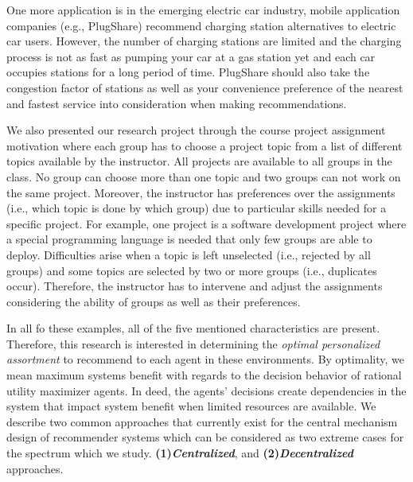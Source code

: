 \documentclass[11pt, letterpaper]{article}
\begin{document}
One more application is in the emerging electric car industry, mobile application companies (e.g., PlugShare) recommend charging station alternatives to electric car users. However, the number of charging stations are limited and the charging process is not as fast as pumping your car at a gas station yet and each car occupies stations for a long period of time. PlugShare should also take the congestion factor of stations as well as your convenience preference of the nearest and fastest service into consideration when making recommendations.

We also presented our research project through the course project assignment motivation where each group has to choose a project topic from a list of different topics available by the instructor. All projects are available to all groups in the class. No group can choose more than one topic and two groups can not work on the same project. Moreover, the instructor has preferences over the assignments (i.e., which topic is done by which group) due to particular skills needed for a specific project. For example, one project is a software development project where a special programming language is needed that only few groups are able to deploy. Difficulties arise when a topic is left unselected (i.e., rejected by all groups) and some topics are selected by two or more groups (i.e., duplicates occur). Therefore, the instructor has to intervene and adjust the assignments considering the ability of groups as well as their preferences.

In all fo these examples, all of the five mentioned characteristics are present. Therefore, this research is interested in determining the \textit{optimal personalized assortment} to recommend to each agent in these environments. By optimality, we mean maximum systems benefit with regards to the decision behavior of rational utility maximizer agents. In deed, the agents' decisions create dependencies in the system that impact system benefit when limited resources are available. We describe two common approaches that currently exist for the central mechanism design of  recommender systems which can be considered as two extreme cases for the spectrum which we study. \textbf{(1)\emph{Centralized}}, and \textbf{(2)\emph{Decentralized}} approaches. 
\end{document}
